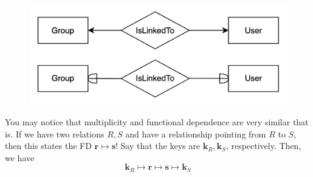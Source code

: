 \documentclass{article}
\begin{document}
\begin{definition}
\begin{enumerate}
        \begin{figure}[H]
          \centering 
          \includegraphics[scale=0.3]{img/islinked.png}
          \caption{} 
          \label{fig:islinked}
        \end{figure}

        \end{enumerate}
      \end{definition}


      You may notice that multiplicity and functional dependence are very similar that is. If we have two relations $R, S$ and have a relationship pointing from $R$ to $S$, then this states the FD $\mathbf{r} \mapsto \mathbf{s}$! Say that the keys are $\mathbf{k}_R, \mathbf{k}_S$, respectively. Then, we have 
      \begin{equation}
        \mathbf{k}_R \mapsto \mathbf{r} \mapsto \mathbf{s} \mapsto \mathbf{k}_S
      \end{equation} 
\end{document}

